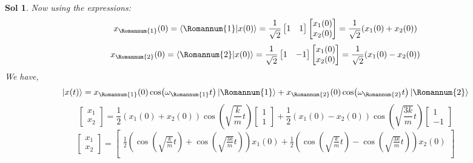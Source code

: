 \documentclass[12pt,a4paper]{report}
\newcommand{\rom}[1]{\Romannum{#1}}
\newtheorem*{solution}{Sol}
\begin{document}
\begin{solution}
    Now using the expressions:
    \begin{equation*}
        x_\rom{1}(0) = \bra{\rom{1}}\ket{x(0)} = \frac{1}{\sqrt{2}}\begin{bmatrix}
            1 & 1
        \end{bmatrix}\begin{bmatrix}
            x_1(0) \\ x_2(0)
        \end{bmatrix} = \frac{1}{\sqrt{2}}(x_1(0) + x_2(0))
    \end{equation*}
    \begin{equation*}
        x_\rom{2}(0) = \bra{\rom{2}}\ket{x(0)} = \frac{1}{\sqrt{2}}\begin{bmatrix}
            1 & -1
        \end{bmatrix}\begin{bmatrix}
            x_1(0) \\ x_2(0)
        \end{bmatrix} = \frac{1}{\sqrt{2}}(x_1(0) - x_2(0))
    \end{equation*}
    We have,
    \begin{equation*}
        \ket{x(t)} = x_\rom{1}(0)\cos(\omega_\rom{1}t) \ket{\rom{1}} + x_\rom{2}(0)\cos(\omega_\rom{2}t) \ket{\rom{2}}
    \end{equation*}
    \begin{equation*}
        \begin{bmatrix}
            x_1 \\
            x_2
        \end{bmatrix} = \frac{1}{2}(x_1(0) + x_2(0))\cos(\sqrt{\frac{k}{m}}t)\begin{bmatrix}
            1 \\
            1
        \end{bmatrix} + \frac{1}{2}(x_1(0) - x_2(0))\cos(\sqrt{\frac{3k}{m}}t) \begin{bmatrix}
            1 \\
            -1
        \end{bmatrix}
    \end{equation*}
    \begin{equation*}
        \begin{bmatrix}
            x_1 \\
            x_2
        \end{bmatrix} = \begin{bmatrix}
            \frac{1}{2}\left(\cos(\sqrt{\frac{k}{m}}t) + \cos(\sqrt{\frac{3k}{m}}t)\right)x_1(0) + \frac{1}{2}\left(\cos(\sqrt{\frac{k}{m}}t) - \cos(\sqrt{\frac{3k}{m}}t)\right)x_2(0) \\

\end{bmatrix}
\end{equation*}
\end{solution}
\end{document}
